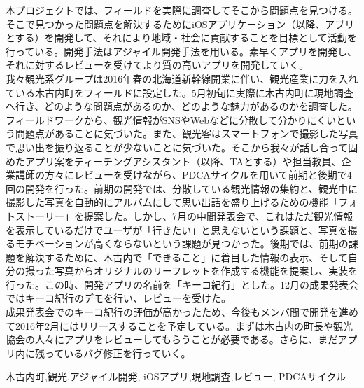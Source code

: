 \begin{jabstract}
\quad 本プロジェクトでは、フィールドを実際に調査してそこから問題点を見つける。そこで見つかった問題点を解決するためにiOSアプリケーション（以降、アプリとする）を開発して、それにより地域・社会に貢献することを目標として活動を行っている。開発手法はアジャイル開発手法を用いる。素早くアプリを開発し、それに対するレビューを受けてより質の高いアプリを開発していく。\\
\quad 我々観光系グループは2016年春の北海道新幹線開業に伴い、観光産業に力を入れている木古内町をフィールドに設定した。5月初旬に実際に木古内町に現地調査へ行き、どのような問題点があるのか、どのような魅力があるのかを調査した。フィールドワークから、観光情報がSNSやWebなどに分散して分かりにくいという問題点があることに気づいた。また、観光客はスマートフォンで撮影した写真で思い出を振り返ることが少ないことに気づいた。そこから我々が話し合って固めたアプリ案をティーチングアシスタント（以降、TAとする）や担当教員、企業講師の方々にレビューを受けながら、PDCAサイクルを用いて前期と後期で4回の開発を行った。前期の開発では、分散している観光情報の集約と、観光中に撮影した写真を自動的にアルバムにして思い出話を盛り上げるための機能「フォトストーリー」を提案した。しかし、7月の中間発表会で、これはただ観光情報を表示しているだけでユーザが「行きたい」と思えないという課題と、写真を撮るモチベーションが高くならないという課題が見つかった。後期では、前期の課題を解決するために、木古内で「できること」に着目した情報の表示、そして自分の撮った写真からオリジナルのリーフレットを作成する機能を提案し、実装を行った。この時、開発アプリの名前を「キーコ紀行」とした。12月の成果発表会ではキーコ紀行のデモを行い、レビューを受けた。\\
\quad 成果発表会でのキーコ紀行の評価が高かったため、今後もメンバ間で開発を進めて2016年2月にはリリースすることを予定している。まずは木古内の町長や観光協会の人々にアプリをレビューしてもらうことが必要である。さらに、まだアプリ内に残っているバグ修正を行っていく。\\

\begin{jkeyword}
木古内町,観光,アジャイル開発, iOSアプリ,現地調査,レビュー, PDCAサイクル
\end{jkeyword}
\end{jabstract}

